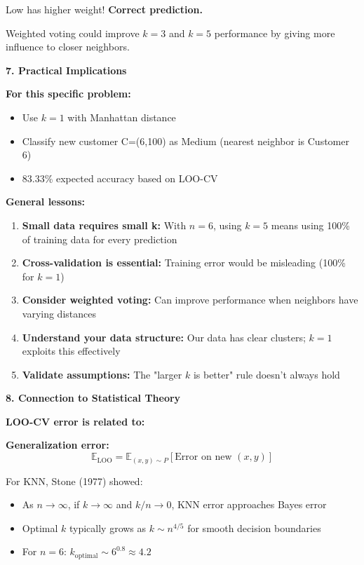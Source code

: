 \documentclass[12pt]{article}
\begin{document}
\begin{explanation}
Low has higher weight! \textbf{Correct prediction.}

Weighted voting could improve \(k=3\) and \(k=5\) performance by giving more influence to closer neighbors.

\textbf{7. Practical Implications}

\textbf{For this specific problem:}
\begin{itemize}
    \item Use \(k=1\) with Manhattan distance
    \item Classify new customer C=(6,100) as Medium (nearest neighbor is Customer 6)
    \item 83.33\% expected accuracy based on LOO-CV
\end{itemize}

\textbf{General lessons:}
\begin{enumerate}
    \item \textbf{Small data requires small k:} With \(n=6\), using \(k=5\) means using 100\% of training data for every prediction
    \item \textbf{Cross-validation is essential:} Training error would be misleading (100\% for \(k=1\))
    \item \textbf{Consider weighted voting:} Can improve performance when neighbors have varying distances
    \item \textbf{Understand your data structure:} Our data has clear clusters; \(k=1\) exploits this effectively
    \item \textbf{Validate assumptions:} The "larger \(k\) is better" rule doesn't always hold
\end{enumerate}

\textbf{8. Connection to Statistical Theory}

\textbf{LOO-CV error is related to:}

\textbf{Generalization error:}
\[
\mathbb{E}_{\text{LOO}} = \mathbb{E}_{(x,y) \sim P}[\text{Error on new }(x,y)]
\]

For KNN, Stone (1977) showed:
\begin{itemize}
    \item As \(n \to \infty\), if \(k \to \infty\) and \(k/n \to 0\), KNN error approaches Bayes error
    \item Optimal \(k\) typically grows as \(k \sim n^{4/5}\) for smooth decision boundaries
    \item For \(n=6\): \(k_{\text{optimal}} \sim 6^{0.8} \approx 4.2\)
\end{itemize}


\end{explanation}
\end{document}
